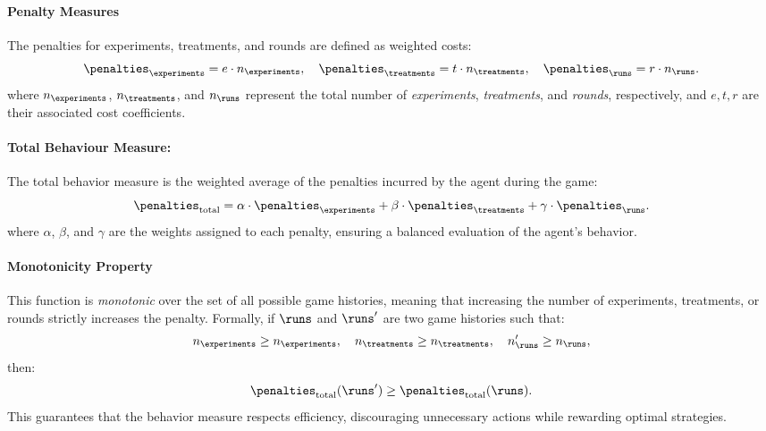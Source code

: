 \documentclass{article}
\begin{document}
            \paragraph{Penalty Measures}
                The penalties for experiments, treatments, and rounds are defined as weighted costs:
                \begin{equation*}
                    \penalties_{\experiments} = e \cdot n_\experiments, \quad
                    \penalties_{\treatments} = t \cdot n_\treatments, \quad
                    \penalties_{\runs} = r \cdot n_\runs.
                \end{equation*}
                where $ n_\experiments $, $ n_\treatments $, and $ n_\runs $ represent the total number of \emph{experiments}, \emph{treatments}, and \emph{rounds}, respectively, and $ e, t, r $ are their associated cost coefficients.


            \paragraph{Total Behaviour Measure:}
                The total behavior measure is the weighted average of the penalties incurred by the agent during the game:
                    \begin{equation*}
                        \penalties_{\text{total}} = \alpha \cdot \penalties_{\experiments} + \beta \cdot \penalties_{\treatments} + \gamma \cdot \penalties_{\runs}.
                    \end{equation*}
                where $\alpha$, $\beta$, and $\gamma$ are the weights assigned to each penalty, ensuring a balanced evaluation of the agent's behavior.

                
            \paragraph{Monotonicity Property}
                This function is \emph{monotonic} over the set of all possible game histories, meaning that increasing the number of experiments, treatments, or rounds strictly increases the penalty. 
                Formally, if $\runs$ and $\runs'$ are two game histories such that:
                \begin{equation*}
                    n_\experiments \geq n_\experiments, \quad
                    n_\treatments \geq n_\treatments, \quad
                    n_\runs' \geq n_\runs,
                \end{equation*}
                then:
                \begin{equation*}
                    \penalties_{\text{total}}(\runs') \geq \penalties_{\text{total}}(\runs).
                \end{equation*}
                This guarantees that the behavior measure respects efficiency, discouraging unnecessary actions while rewarding optimal strategies.
\end{document}
